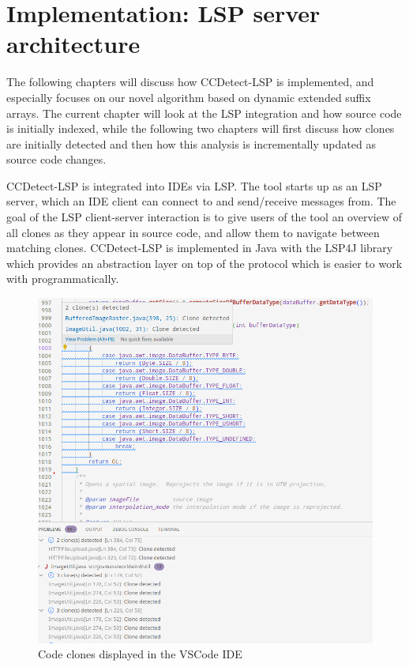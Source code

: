 \chapter{Implementation: LSP server architecture} \label{lspimplementation}

The following chapters will discuss how CCDetect-LSP is implemented, and
especially focuses on our novel algorithm based on dynamic extended suffix arrays. The
current chapter will look at the LSP integration and how source code is initially indexed,
while the following two chapters will first discuss how clones are initially detected and
then how this analysis is incrementally updated as source code changes.

CCDetect-LSP is integrated into IDEs via LSP. The tool starts up as an LSP server, which
an IDE client can connect to and send/receive messages from. The goal of the LSP
client-server interaction is to give users of the tool an overview of all clones as they
appear in source code, and allow them to navigate between matching clones. CCDetect-LSP is
implemented in Java with the LSP4J library which provides an abstraction layer on top of
the protocol which is easier to work with programmatically.

\begin{figure}[ht!]
	\includegraphics[width=\textwidth]{figures/vscodecodeclone.png}
	\caption{Code clones displayed in the VSCode IDE}
	\label{fig:vscodeclones}
\end{figure}

